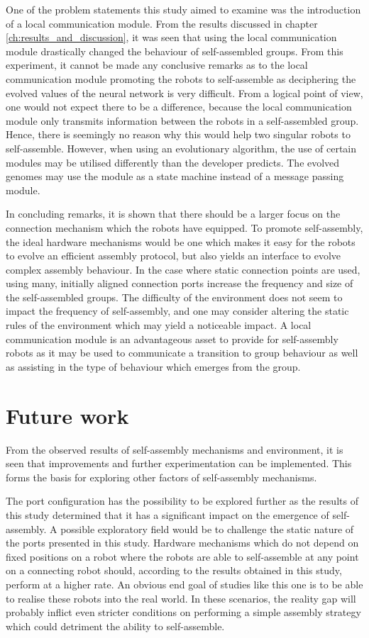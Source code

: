 One of the problem statements this study aimed to examine was the introduction of a local communication module. From the results discussed in chapter  \ref{ch:results_and_discussion}, it was seen that using the local communication module drastically changed the behaviour of self-assembled groups. 
From this experiment, it cannot be made any conclusive remarks as to the local communication module promoting the robots to self-assemble as deciphering the evolved values of the neural network is very difficult.
From a logical point of view, one would not expect there to be a difference, because the local communication module only transmits information between the robots in a self-assembled group. 
Hence, there is seemingly no reason why this would help two singular robots to self-assemble.
However, when using an evolutionary algorithm, the use of certain modules may be utilised differently than the developer predicts.
The evolved genomes may use the module as a state machine instead of a message passing module.

In concluding remarks, it is shown that there should be a larger focus on the connection mechanism which the robots have equipped.
To promote self-assembly, the ideal hardware mechanisms would be one which makes it easy for the robots to evolve an efficient assembly protocol, but also yields an interface to evolve complex assembly behaviour.
In the case where static connection points are used, using many, initially aligned connection ports increase the frequency and size of the self-assembled groups.
The difficulty of the environment does not seem to impact the frequency of self-assembly, and one may consider altering the static rules of the environment which may yield a noticeable impact.
A local communication module is an advantageous asset to provide for self-assembly robots as it may be used to communicate a transition to group behaviour as well as assisting in the type of behaviour which emerges from the group. 
  


\section{Future work}
From the observed results of self-assembly mechanisms and environment, it is seen that improvements and further experimentation can be implemented. 
This forms the basis for exploring other factors of self-assembly mechanisms.

The port configuration has the possibility to be explored further as the results of this study determined that it has a significant impact on the emergence of self-assembly. 
A possible exploratory field would be to challenge the static nature of the ports presented in this study.
Hardware mechanisms which do not depend on fixed positions on a robot where the robots are able to self-assemble at any point on a connecting robot should, according to the results obtained in this study, perform at a higher rate.
An obvious end goal of studies like this one is to be able to realise these robots into the real world.
In these scenarios, the reality gap will probably inflict even stricter conditions on performing a simple assembly strategy which could detriment the ability to self-assemble.

